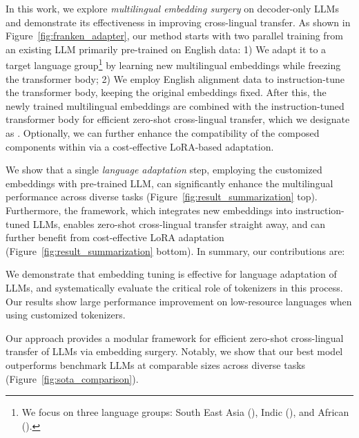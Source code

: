 In this work, we explore \emph{multilingual embedding surgery} on decoder-only LLMs and demonstrate its effectiveness in improving cross-lingual transfer.
As shown in Figure~\ref{fig:franken_adapter}, our method starts with two parallel training from an existing LLM primarily pre-trained on English data: 1) We adapt it to a target language group\footnote{We focus on three language groups: South East Asia (\sea), Indic (\ind), and African (\afr).} by learning new multilingual embeddings while freezing the transformer body; 2) We employ English alignment data to instruction-tune the transformer body, keeping the original embeddings fixed. After this, the newly trained multilingual embeddings are combined with the instruction-tuned transformer body for efficient zero-shot cross-lingual transfer, which we designate as \emph{\ouradapter}. Optionally, we can further enhance the compatibility of the composed components within \emph{\ouradapter} via a cost-effective LoRA-based adaptation. 

We show that a single \emph{language adaptation} step, employing the customized embeddings with pre-trained LLM, can significantly enhance the multilingual performance across diverse tasks (Figure~\ref{fig:result_summarization} top). Furthermore, the \emph{\ouradapter} framework, which integrates new embeddings into instruction-tuned LLMs, enables zero-shot cross-lingual transfer straight away, and can further benefit from cost-effective LoRA adaptation (Figure~\ref{fig:result_summarization} bottom). 
In summary, our contributions are:
\begin{compactenum}
    \item We demonstrate that embedding tuning is effective for language adaptation of LLMs, and systematically evaluate the critical role of tokenizers in this process. Our results show large performance improvement on low-resource languages when using customized tokenizers.
    \item Our \ouradapter approach provides a modular framework for efficient zero-shot cross-lingual transfer of LLMs via embedding surgery. Notably, we show that our best model outperforms benchmark LLMs at comparable sizes across diverse tasks (Figure~\ref{fig:sota_comparison}).
\end{compactenum}

